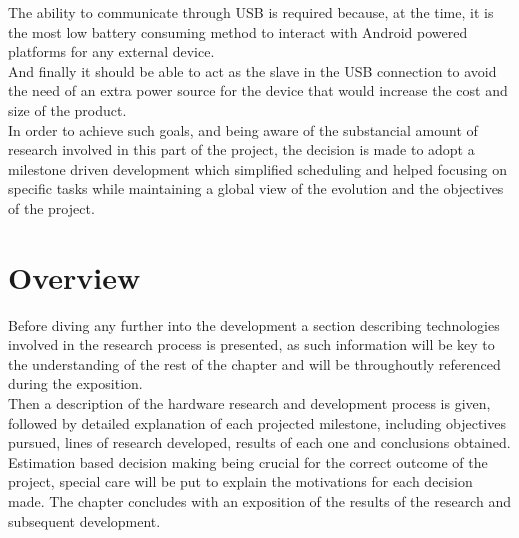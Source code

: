	The ability to communicate through USB is required because, at the time, it is the most low battery consuming method to interact with Android powered platforms for any external device.\\

	And finally it should be able to act as the slave in the USB connection to avoid the need of an extra power source for the device that would increase the cost and size of the product.\\


	In order to achieve such goals, and being aware of the substancial amount of research involved in this part of the project, the decision is made to adopt a milestone driven development which simplified scheduling and helped focusing on specific tasks while maintaining a global view of the evolution and the objectives of the project.\\

	\section{Overview}
	\label{sec:hw-oview}

	Before diving any further into the development a section describing technologies involved in the research process is presented, as such information will be key to the understanding of the rest of the chapter and will be throughoutly referenced during the exposition.\\

	Then a description of the hardware research and development process is given, followed by detailed explanation of each projected milestone, including objectives pursued, lines of research developed, results of each one and conclusions obtained. Estimation based decision making being crucial for the correct outcome of the project, special care will be put to explain the motivations for each decision made. The chapter concludes with an exposition of the results of the research and subsequent development.

